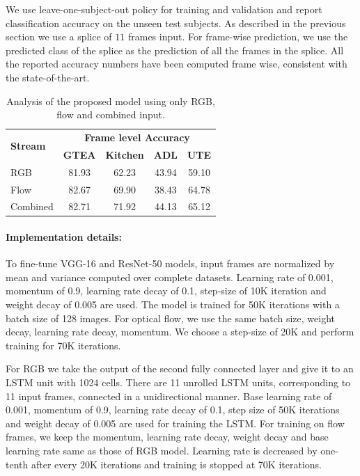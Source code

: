 \documentclass{article}
\begin{document}
We use leave-one-subject-out policy for training and validation and report classification accuracy on the unseen test subjects. As described in the previous section we use a splice of $11$ frames input. For frame-wise prediction, we use the predicted class of the splice as the prediction of all the frames in the splice. All the reported accuracy numbers have been computed frame wise, consistent with the state-of-the-art.

\renewcommand{\tabcolsep}{0.05cm}

\begin{table}
\centering
\begin{tabular}{l c c c c} \toprule[0.2mm]
\multirow{2}{*}{\textbf{Stream}} & \multicolumn{4}{c}{\textbf{Frame level Accuracy}} \\ \cmidrule{2-5}
& \textbf{GTEA} \cite{fathi2011learning} & \textbf{Kitchen} \cite{spriggs2009temporal}  & \textbf{ADL} \cite{pirsiavash2012detecting} & \textbf{UTE} \cite{lee2012discovering} \\ \midrule
RGB & 81.93 & 62.23 & 43.94  & 59.10 \\
Flow & 82.67 & 69.90 & 38.43 & 64.78 \\ \midrule
Combined & 82.71  & 71.92 & 44.13 & 65.12 \\ \bottomrule[0.2mm]
\end{tabular}
\caption{Analysis of the proposed model using only RGB, flow and combined input.}
\label{table:flowVsrgb}
\end{table}

\paragraph*{Implementation details:}

To fine-tune VGG-16 and ResNet-50 models, input frames are normalized by mean and variance computed over complete datasets. Learning rate of 0.001, momentum of 0.9, learning rate decay of 0.1, step-size of 10K iteration and weight decay of 0.005 are used. The model is trained for 50K iterations with a batch size of 128 images. For optical flow, we use the same batch size, weight decay, learning rate decay, momentum. We choose a step-size of 20K and perform training for 70K iterations.

For RGB we take the output of the second fully connected layer and give it to an LSTM unit with 1024 cells. There are 11 unrolled LSTM units, corresponding to 11 input frames, connected in a unidirectional manner. Base learning rate of 0.001, momentum of 0.9, learning rate decay of 0.1, step size of 50K iterations and weight decay of 0.005 are used for training the LSTM. For training on flow frames, we keep the momentum, learning rate decay, weight decay and base learning rate same as those of RGB model. Learning rate is decreased by one-tenth after every 20K iterations and training is stopped at 70K iterations.
\end{document}
